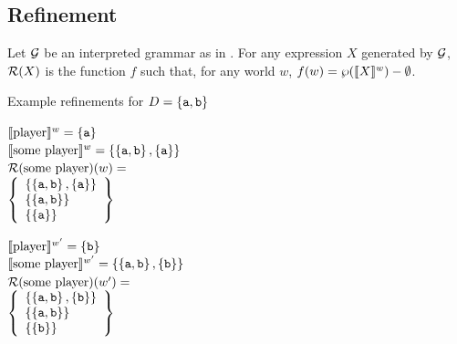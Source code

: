 \documentclass{article}
\begin{document}

\subsection{Refinement}

\begin{examples}
\item\label{refinement} Let $\Grammar$ be an interpreted grammar as in
  .  For any expression $X$ generated by $\Grammar$,
  $\Refine(X)$ is the function $f$ such that, for any world $w$,
  $f(w) = \wp(\semw{$X$}) - \emptyset$.

\item Example refinements for $D = \set{\playera,\playerb}$
 
  \begin{minipage}[t]{0.48\linewidth}
    $\semw{player} = \set{\playera}$ \\[2ex]    
    $\semw{some player} = \set{\set{\playera,\playerb}, \set{\playera}}$ \\[2ex]    
    $\Refine(\text{some player})(w) =$\\[2ex]
    $\set{
      \begin{array}[c]{l}
        \set{\set{\playera,\playerb}, \set{\playera}} \\
        \set{\set{\playera,\playerb}} \\
        \set{\set{\playera}} \\
      \end{array}
    }$    
  \end{minipage}
  \hfill
  \begin{minipage}[t]{0.48\linewidth}
    $\semw[w']{player} = \set{\playerb}$ \\[2ex]    
    $\semw[w']{some player} = \set{\set{\playera,\playerb}, \set{\playerb}}$ \\[2ex]    
    $\Refine(\text{some player})(w') =$ \\[2ex]
    $\set{
      \begin{array}[c]{l}
        \set{\set{\playera,\playerb}, \set{\playerb}} \\
        \set{\set{\playera,\playerb}} \\
        \set{\set{\playerb}} \\
      \end{array}
    }$    
  \end{minipage}  
\end{examples}
\end{document}
